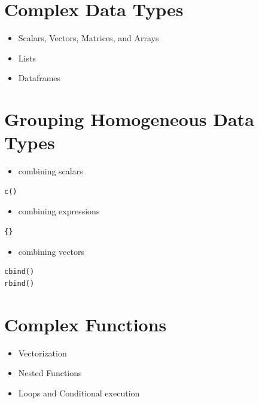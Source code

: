 \documentclass[
]{book}
\providecommand{\tightlist}{%
  \setlength{\itemsep}{0pt}\setlength{\parskip}{0pt}}
\begin{document}
\hypertarget{complex-data-types}{%
\section{Complex Data Types}\label{complex-data-types}}

\begin{itemize}
\tightlist
\item
  Scalars, Vectors, Matrices, and Arrays
\item
  Lists
\item
  Dataframes
\end{itemize}

\hypertarget{grouping-homogeneous-data-types}{%
\section{Grouping Homogeneous Data Types}\label{grouping-homogeneous-data-types}}

\begin{itemize}
\tightlist
\item
  combining scalars
\end{itemize}

\begin{verbatim}
c()
\end{verbatim}

\begin{itemize}
\tightlist
\item
  combining expressions
\end{itemize}

\begin{verbatim}
{}
\end{verbatim}

\begin{itemize}
\tightlist
\item
  combining vectors
\end{itemize}

\begin{verbatim}
cbind()
rbind()
\end{verbatim}

\hypertarget{complex-functions}{%
\section{Complex Functions}\label{complex-functions}}

\begin{itemize}
\tightlist
\item
  Vectorization
\item
  Nested Functions
\item
  Loops and Conditional execution
\end{itemize}
\end{document}
